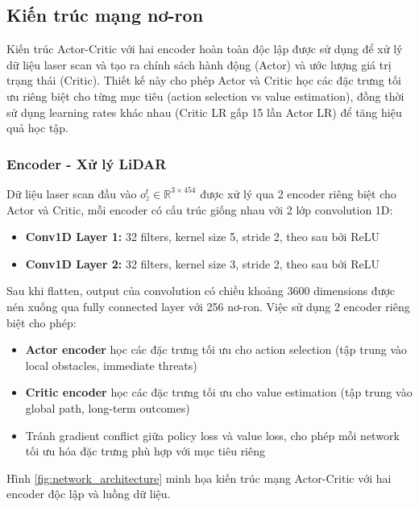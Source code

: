 \subsection{Kiến trúc mạng nơ-ron}
\label{sec:network}

Kiến trúc Actor-Critic với hai encoder hoàn toàn độc lập được sử dụng để xử lý dữ liệu laser scan và tạo ra chính sách hành động (Actor) và ước lượng giá trị trạng thái (Critic). Thiết kế này cho phép Actor và Critic học các đặc trưng tối ưu riêng biệt cho từng mục tiêu (action selection vs value estimation), đồng thời sử dụng learning rates khác nhau (Critic LR gấp 15 lần Actor LR) để tăng hiệu quả học tập.

\subsubsection{Encoder - Xử lý LiDAR}

Dữ liệu laser scan đầu vào $o_z^t \in \mathbb{R}^{3 \times 454}$ được xử lý qua 2 encoder riêng biệt cho Actor và Critic, mỗi encoder có cấu trúc giống nhau với 2 lớp convolution 1D:

\begin{itemize}[nosep]
\item \textbf{Conv1D Layer 1:} 32 filters, kernel size 5, stride 2, theo sau bởi ReLU
\item \textbf{Conv1D Layer 2:} 32 filters, kernel size 3, stride 2, theo sau bởi ReLU
\end{itemize}

Sau khi flatten, output của convolution có chiều khoảng 3600 dimensions được nén xuống qua fully connected layer với 256 nơ-ron. Việc sử dụng 2 encoder riêng biệt cho phép:

\begin{itemize}[nosep]
\item \textbf{Actor encoder} học các đặc trưng tối ưu cho action selection (tập trung vào local obstacles, immediate threats)
\item \textbf{Critic encoder} học các đặc trưng tối ưu cho value estimation (tập trung vào global path, long-term outcomes)
\item Tránh gradient conflict giữa policy loss và value loss, cho phép mỗi network tối ưu hóa đặc trưng phù hợp với mục tiêu riêng
\end{itemize}

Hình \ref{fig:network_architecture} minh họa kiến trúc mạng Actor-Critic với hai encoder độc lập và luồng dữ liệu.

